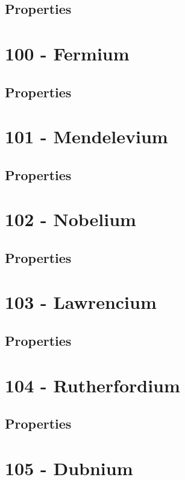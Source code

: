 \documentclass{book}
\begin{document}
\subsection{Properties}

\section{100 - Fermium}
\label{sec:elem-fermium}
\subsection{Properties}

\section{101 - Mendelevium}
\label{sec:elem-mendelevium}
\subsection{Properties}

\section{102 - Nobelium}
\label{sec:elem-nobelium}
\subsection{Properties}

\section{103 - Lawrencium}
\label{sec:elem-lawrencium}
\subsection{Properties}

\section{104 - Rutherfordium}
\label{sec:elem-rutherfordium}
\subsection{Properties}

\section{105 - Dubnium}
\label{sec:elem-dubnium}
\end{document}
